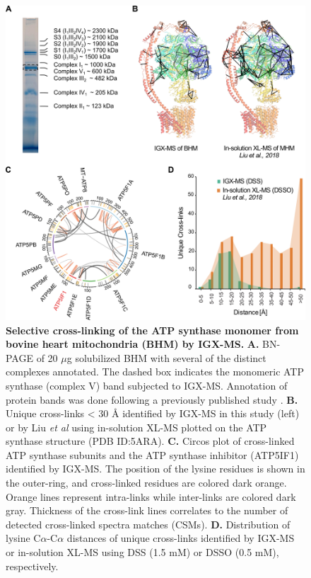 \begin{figure}[p]
    \center
    \includegraphics[]{Chapter.2/Figures/Figure4.png}
    \caption{\textbf{Selective cross-linking of the ATP synthase monomer from bovine heart mitochondria (BHM) by IGX-MS.} \textbf{A.} BN-PAGE of 20 $\mu$g solubilized BHM with several of the distinct complexes annotated. The dashed box indicates the monomeric ATP synthase (complex V) band subjected to IGX-MS. Annotation of protein bands was done following a previously published study \cite{Wittig_2010}. \textbf{B.} Unique cross-links < 30 Å identified by IGX-MS in this study (left) or by Liu \emph{et al} \cite{Liu_2018} using in-solution XL-MS plotted on the ATP synthase structure (PDB ID:5ARA). \textbf{C.} Circos plot of cross-linked ATP synthase subunits and the ATP synthase inhibitor (ATP5IF1) identified by IGX-MS. The position of the lysine residues is shown in the outer-ring, and cross-linked residues are colored dark orange. Orange lines represent intra-links while inter-links are colored dark gray. Thickness of the cross-link lines correlates to the number of detected cross-linked spectra matches (CSMs). \textbf{D.} Distribution of lysine C$\alpha$-C$\alpha$ distances of unique cross-links identified by IGX-MS or in-solution XL-MS \cite{Liu_2018} using DSS (1.5 mM) or DSSO (0.5 mM), respectively.}
    \label{fig:ch2_fig4}
\end{figure}
